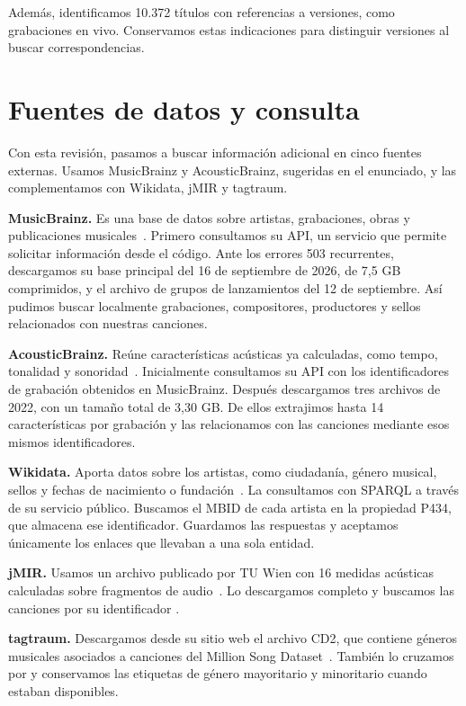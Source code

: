 \documentclass[11pt,a4paper]{article}
\begin{document}
Además, identificamos 10.372 títulos con referencias a versiones, como grabaciones en vivo. Conservamos estas indicaciones para distinguir versiones al buscar correspondencias.

\section{Fuentes de datos y consulta}
Con esta revisión, pasamos a buscar información adicional en cinco fuentes externas. Usamos MusicBrainz y AcousticBrainz, sugeridas en el enunciado, y las complementamos con Wikidata, jMIR y tagtraum.

\textbf{MusicBrainz.} Es una base de datos sobre artistas, grabaciones, obras y publicaciones musicales~\cite{mb}. Primero consultamos su API, un servicio que permite solicitar información desde el código. Ante los errores 503 recurrentes, descargamos su base principal del 16 de septiembre de 2026, de 7,5 GB comprimidos, y el archivo de grupos de lanzamientos del 12 de septiembre. Así pudimos buscar localmente grabaciones, compositores, productores y sellos relacionados con nuestras canciones.

\textbf{AcousticBrainz.} Reúne características acústicas ya calculadas, como tempo, tonalidad y sonoridad~\cite{ab}. Inicialmente consultamos su API con los identificadores de grabación obtenidos en MusicBrainz. Después descargamos tres archivos de 2022, con un tamaño total de 3,30 GB. De ellos extrajimos hasta 14 características por grabación y las relacionamos con las canciones mediante esos mismos identificadores.

\textbf{Wikidata.} Aporta datos sobre los artistas, como ciudadanía, género musical, sellos y fechas de nacimiento o fundación~\cite{wd}. La consultamos con SPARQL a través de su servicio público. Buscamos el MBID de cada artista en la propiedad P434, que almacena ese identificador. Guardamos las respuestas y aceptamos únicamente los enlaces que llevaban a una sola entidad.

\textbf{jMIR.} Usamos un archivo publicado por TU Wien con 16 medidas acústicas calculadas sobre fragmentos de audio~\cite{jmir}. Lo descargamos completo y buscamos las canciones por su identificador .

\textbf{tagtraum.} Descargamos desde su sitio web el archivo CD2, que contiene géneros musicales asociados a canciones del Million Song Dataset~\cite{tagtraum}. También lo cruzamos por  y conservamos las etiquetas de género mayoritario y minoritario cuando estaban disponibles.
\end{document}
